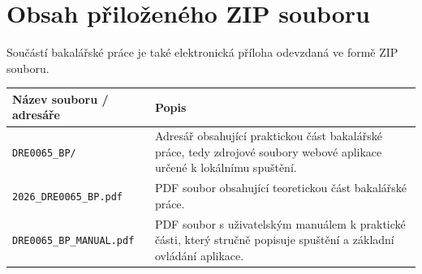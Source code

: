 \chapter{Obsah přiloženého ZIP souboru}

Součástí bakalářské práce je také elektronická příloha odevzdaná ve formě ZIP souboru.

\begin{table}[H]
\centering
\renewcommand{\arraystretch}{1.15}
\begin{tabular}{|L{0.30\textwidth}|L{0.62\textwidth}|}
\hline
\textbf{Název souboru / adresáře} & \textbf{Popis} \\
\hline
\texttt{DRE0065\_BP/} & Adresář obsahující praktickou část bakalářské práce, tedy zdrojové soubory webové aplikace určené k lokálnímu spuštění. \\
\hline
\texttt{2026\_DRE0065\_BP.pdf} & PDF soubor obsahující teoretickou část bakalářské práce. \\
\hline
\texttt{DRE0065\_BP\_MANUAL.pdf} & PDF soubor s uživatelským manuálem k praktické části, který stručně popisuje spuštění a základní ovládání aplikace. \\
\hline
\end{tabular}
\end{table}

\endinput